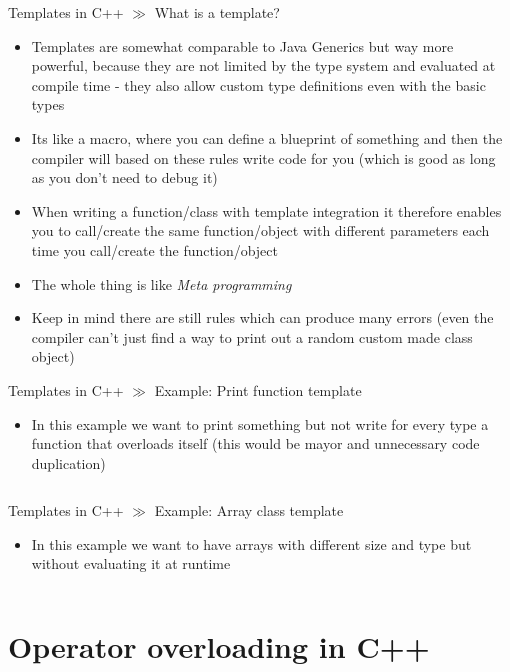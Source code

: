 \documentclass[10pt]{beamer}
\begin{document}
\begin{frame}{Templates in C++ $\gg$ What is a template?}
\begin{itemize}
	\item Templates are somewhat comparable to Java Generics but way more powerful, because they are not limited by the type system and evaluated at compile time - they also allow custom type definitions even with the basic types
	\item Its like a macro, where you can define a blueprint of something and then the compiler will based on these rules write code for you (which is good as long as you don't need to debug it)
	\item When writing a function/class with template integration it therefore enables you to call/create the same function/object with different parameters each time you call/create the function/object
	\item The whole thing is like \textit{Meta programming}
	\item Keep in mind there are still rules which can produce many errors (even the compiler can't just find a way to print out a random custom made class object)
\end{itemize}
\end{frame}

\begin{frame}{Templates in C++ $\gg$ Example: Print function template}
\begin{itemize}
	\item In this example we want to print something but not write for every type a function that overloads itself (this would be mayor and unnecessary code duplication)
	\inputminted[bgcolor=lightGreyCustom,fontsize=\scriptsize ]{cpp}{./resources/templates/print_function_template_example.cpp}
\end{itemize}
\end{frame}

\begin{frame}{Templates in C++ $\gg$ Example: Array class template}
\begin{itemize}
	\item In this example we want to have arrays with different size and type but without evaluating it at runtime
	\inputminted[bgcolor=lightGreyCustom,fontsize=\scriptsize ]{cpp}{./resources/templates/array_class_template_example.cpp}
\end{itemize}
\end{frame}

\section{Operator overloading in C++}
\end{document}
